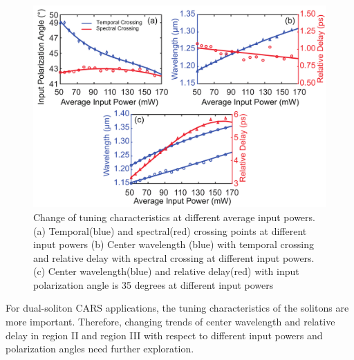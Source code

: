 \documentclass{osa-article}
\begin{document}
\begin{figure}[htbp]
\centering%
\includegraphics[width=320pt]{fig_tuning.pdf}
\caption{Change of tuning characteristics at different average input powers. (a) Temporal(blue) and spectral(red) crossing points at different input powers (b) Center wavelength (blue) with temporal crossing and relative delay with spectral crossing at different input powers. (c) Center wavelength(blue) and relative delay(red) with input polarization angle is 35 degrees at different input powers }
\label{fig_tuning}\vspace*{-6pt}
\end{figure}

For dual-soliton CARS applications\cite{chen_dual-soliton_2016,chen_quantitative_2016}, the tuning characteristics of the solitons are more important. Therefore, changing trends of center wavelength and relative delay in region II and region III with respect to different input powers and polarization angles need further exploration.  
\end{document}
